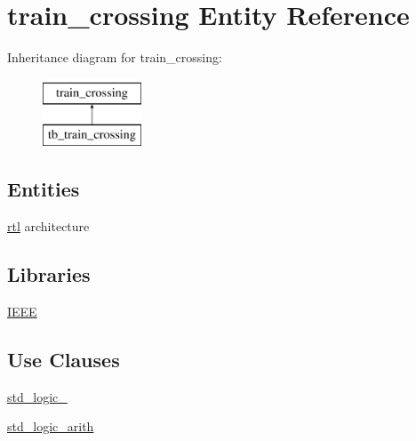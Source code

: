\hypertarget{classtrain__crossing}{}\section{train\+\_\+crossing Entity Reference}
\label{classtrain__crossing}
Inheritance diagram for train\+\_\+crossing\+:\begin{figure}[H]
\begin{center}
\leavevmode
\includegraphics[height=2.000000cm]{classtrain__crossing}
\end{center}
\end{figure}
\subsection*{Entities}
\begin{DoxyCompactItemize}
\item 
\hyperlink{classtrain__crossing_1_1rtl}{rtl} architecture
\end{DoxyCompactItemize}
\subsection*{Libraries}
 \begin{DoxyCompactItemize}
\item 
\mbox{\label{classtrain__crossing_ae4f03c286607f3181e16b9aa12d0c6d4}} 
\hyperlink{classtrain__crossing_ae4f03c286607f3181e16b9aa12d0c6d4}{I\+E\+EE} 
\end{DoxyCompactItemize}
\subsection*{Use Clauses}
 \begin{DoxyCompactItemize}
\item 
\mbox{\label{classtrain__crossing_acd03516902501cd1c7296a98e22c6fcb}} 
\hyperlink{classtrain__crossing_acd03516902501cd1c7296a98e22c6fcb}{std\+\_\+logic\+\_}   
\item 
\mbox{\label{classtrain__crossing_a0f5ecc6613f63d07f7963a97b1b26095}} 
\hyperlink{classtrain__crossing_a0f5ecc6613f63d07f7963a97b1b26095}{std\+\_\+logic\+\_\+arith}   
\end{DoxyCompactItemize}
